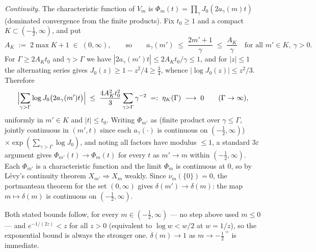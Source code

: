 \emph{Continuity.} The characteristic function of $V_m$ is
$\Phi_m(t)=\prod_{\gamma}J_0(2a_\gamma(m)t)$ (dominated convergence
from the finite products). Fix $t_0\ge1$ and a compact
$K\subset(-\tfrac12,\infty)$, and put
\[
A_K\;:=\;2\max K+1\;\in\;(0,\infty),
\qquad\text{so}\qquad
a_\gamma(m')\;\le\;\frac{2m'+1}{\gamma}\;\le\;\frac{A_K}{\gamma}
\quad\text{for all } m'\in K,\ \gamma>0 .
\]
For $\Gamma\ge2A_Kt_0$ and $\gamma>\Gamma$ we have
$|2a_\gamma(m')t|\le 2A_Kt_0/\gamma\le1$, and for $|z|\le1$ the
alternating series gives $J_0(z)\ge1-z^2/4\ge\tfrac34$, whence
$|\log J_0(z)|\le z^2/3$. Therefore
\[
\Bigl|\sum_{\gamma>\Gamma}\log J_0\bigl(2a_\gamma(m')t\bigr)\Bigr|
\;\le\;\frac{4A_K^2t_0^2}{3}\sum_{\gamma>\Gamma}\gamma^{-2}
\;=:\;\eta_K(\Gamma)\;\longrightarrow\;0\qquad(\Gamma\to\infty),
\]
uniformly in $m'\in K$ and $|t|\le t_0$. Writing $\Phi_{m'}$ as (finite
product over $\gamma\le\Gamma$, jointly continuous in $(m',t)$ since
each $a_\gamma(\cdot)$ is continuous on $(-\tfrac12,\infty)$)
$\times\exp(\sum_{\gamma>\Gamma}\log J_0)$, and noting all factors
have modulus $\le1$, a standard $3\varepsilon$ argument gives
$\Phi_{m'}(t)\to\Phi_m(t)$ for every $t$ as $m'\to m$ within
$(-\tfrac12,\infty)$. Each $\Phi_{m'}$ is a characteristic function and
the limit $\Phi_m$ is continuous at $0$, so by L\'evy's continuity
theorem $X_{m'}\Rightarrow X_m$ weakly. Since $\nu_m(\{0\})=0$, the
portmanteau theorem for the set $(0,\infty)$ gives
$\delta(m')\to\delta(m)$: the map $m\mapsto\delta(m)$ is continuous on
$(-\tfrac12,\infty)$.



Both stated bounds follow, for every $m\in(-\tfrac12,\infty)$ --- no
step above used $m\le0$ --- and $e^{-1/(2z)}<z$ for all $z>0$
(equivalent to $\log w<w/2$ at $w=1/z$), so the exponential bound is
always the stronger one. $\delta(m)\to1$ as $m\to-\tfrac12^{\,+}$ is
immediate.

